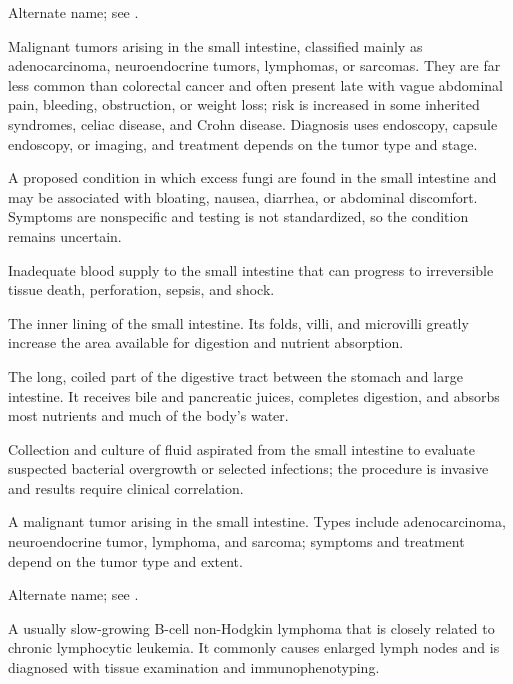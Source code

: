  Alternate name;
  see .

 Malignant tumors arising in the small intestine,
classified mainly as adenocarcinoma, neuroendocrine tumors, lymphomas, or sarcomas. They
are far less common than colorectal cancer and often present late with vague abdominal
pain, bleeding, obstruction, or weight loss; risk is increased in some inherited
syndromes, celiac disease, and Crohn disease. Diagnosis uses endoscopy, capsule
endoscopy, or imaging, and treatment depends on the tumor type and stage.

 A proposed condition in which excess fungi are found in the small intestine and may be associated with bloating, nausea, diarrhea, or abdominal discomfort. Symptoms are nonspecific and testing is not standardized, so the condition remains uncertain.

 Inadequate blood supply to the small intestine that can progress to irreversible tissue death, perforation, sepsis, and shock.

 The inner lining of the small intestine. Its folds, villi, and microvilli greatly increase the area available for digestion and nutrient absorption.

 The long, coiled part of the digestive tract between the stomach and large intestine. It receives bile and pancreatic juices, completes digestion, and absorbs most nutrients and much of the body's water.

 Collection and culture of fluid aspirated from the small intestine to evaluate suspected bacterial overgrowth or selected infections; the procedure is invasive and results require clinical correlation.

 A malignant tumor arising in the small intestine. Types include adenocarcinoma, neuroendocrine tumor, lymphoma, and sarcoma; symptoms and treatment depend on the tumor type and extent.

 Alternate name; see .

 A usually slow-growing B-cell non-Hodgkin lymphoma that is closely related to chronic lymphocytic leukemia. It commonly causes enlarged lymph nodes and is diagnosed with tissue examination and immunophenotyping.

